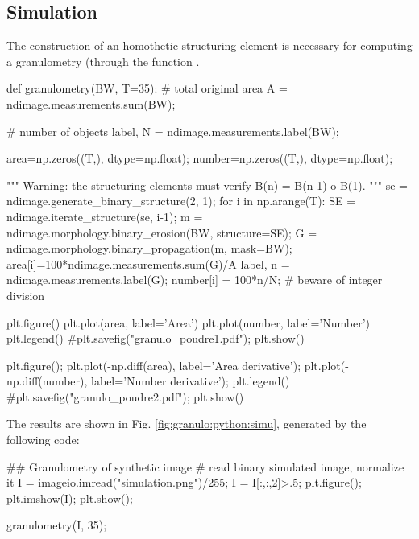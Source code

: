 \def\QRCODE{TB_IPR_TUT.IMG.granulometry_pythonqrcode.png}
\def\QRPAGE{http://www.iptutorials.science/tree/master/TB_IPR/TUT.IMG.granulometry/python}
\subsection{Simulation}
The construction of an homothetic structuring element is necessary for computing a granulometry (through the function .

\begin{python}
def granulometry(BW, T=35):
    # total original area
    A = ndimage.measurements.sum(BW);
    
    # number of objects
    label, N = ndimage.measurements.label(BW);
    
    area=np.zeros((T,), dtype=np.float);
    number=np.zeros((T,), dtype=np.float);
    
    """
    Warning: the structuring elements must verify B(n) = B(n-1) o B(1).
    """
    se = ndimage.generate_binary_structure(2, 1);
    for i in np.arange(T):
        SE = ndimage.iterate_structure(se, i-1);
        m = ndimage.morphology.binary_erosion(BW, structure=SE);
        G = ndimage.morphology.binary_propagation(m, mask=BW);
        area[i]=100*ndimage.measurements.sum(G)/A
        label, n = ndimage.measurements.label(G);
        number[i] = 100*n/N; # beware of integer division
    
    plt.figure()
    plt.plot(area, label='Area')
    plt.plot(number, label='Number')
    plt.legend()
    #plt.savefig("granulo_poudre1.pdf");
    plt.show()
    
    plt.figure();
    plt.plot(-np.diff(area), label='Area derivative');
    plt.plot(-np.diff(number), label='Number derivative');
    plt.legend()
    #plt.savefig("granulo_poudre2.pdf");
    plt.show()
\end{python}

The results are shown in Fig. \ref{fig:granulo:python:simu}, generated by the following code:
\begin{python}
## Granulometry of synthetic image
# read binary simulated image, normalize it
I = imageio.imread("simulation.png")/255;
I = I[:,:,2]>.5;
plt.figure();
plt.imshow(I);
plt.show();

granulometry(I, 35);
\end{python}

